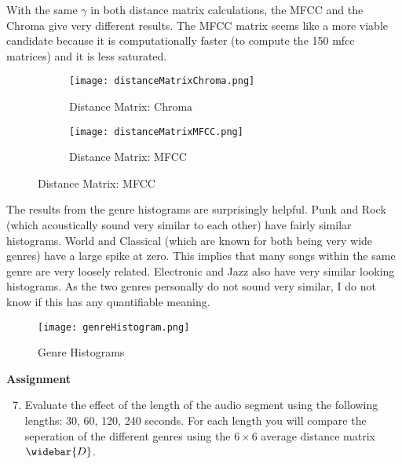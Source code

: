 \documentclass{article} %
\begin{document}
With the same $\gamma$ in both distance matrix calculations, the MFCC and the Chroma give very different results. The MFCC matrix seems like a more viable candidate because it is
computationally faster (to compute the 150 mfcc matrices) and it is less saturated. 

\begin{figure}[H]
\begin{subfigure}{0.5\textwidth}
\centering
\texttt{[image: distanceMatrixChroma.png]}
\caption{Distance Matrix: Chroma}
\label{fig:dMatChr}
\end{subfigure}
\begin{subfigure}{0.5\textwidth}
\centering
\texttt{[image: distanceMatrixMFCC.png]}
\caption{Distance Matrix: MFCC}
\label{fig:dMatChr}
\end{subfigure}
\end{figure}


 


The results from the genre histograms are surprisingly helpful. Punk and Rock (which acoustically sound very similar to each other) have fairly similar histograms. 
World and Classical (which are known for both being very wide genres) have a large spike at zero. This implies that many songs within the same genre are very loosely related. 
Electronic and Jazz also have very similar looking histograms. As the two genres personally do not sound very similar, I do not know if this has any quantifiable meaning. 

\begin{figure}[H]
\centering
\texttt{[image: genreHistogram.png]}
\caption{Genre Histograms}
\label{fig:genreHisto}
\end{figure}

 




\begin{framed}
\textbf{Assignment}
\begin{enumerate}
\setcounter{enumi}{6}
\item Evaluate the effect of the length of the audio segment using the following lengths: 30, 60, 120, 240 seconds. For each length you will compare the seperation of the different genres
 using the $6 \times 6$  average distance matrix $\widebar{D}$.
\end{enumerate}
\end{framed}
\end{document}
